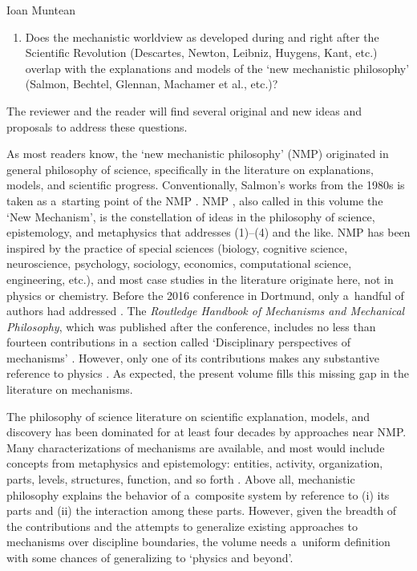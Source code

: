 \begin{recengenv}{Ioan Muntean}
\begin{enumerate}[label={(\arabic*)}]
\item Does the mechanistic worldview as developed during and right after the Scientific Revolution (Descartes, Newton, Leibniz, Huygens, Kant, etc.) overlap with the explanations and models of the ‘new mechanistic philosophy' (Salmon, Bechtel, Glennan, Machamer et al., etc.)?
\end{enumerate}

The reviewer and the reader will find several original and new ideas and proposals to address these questions.

As most readers know, the ‘new mechanistic philosophy' (NMP) originated in general philosophy of science, specifically in the literature on explanations, models, and scientific progress. Conventionally, Salmon's works from the 1980s is taken as a~starting point of the NMP
\parencites[][]{salmon_scientific_1984}[][]{salmon_four_1989}. %
 NMP 
\parencites[][]{glennan_new_2017}[][]{illari_routledge_2017}, %
 also called in this volume the ‘New Mechanism', is the constellation of ideas in the philosophy of science, epistemology, and metaphysics that addresses (1)–(4) and the like. NMP has been inspired by the practice of special sciences (biology, cognitive science, neuroscience, psychology, sociology, economics, computational science, engineering, etc.), and most case studies in the literature originate here, not in physics or chemistry. Before the 2016 conference in Dortmund, only a~handful of authors had addressed 
\parencites[][]{illari_what_2011}[][]{kuhlmann_relation_2014}. %
 The \textit{Routledge Handbook of Mechanisms and Mechanical Philosophy}, which was published after the conference, includes no less than fourteen contributions in a~section called ‘Disciplinary perspectives of mechanisms' 
\parencite[][]{illari_routledge_2017}. %
 However, only one of its contributions makes any substantive reference to physics 
\parencite[][]{kuhlmann_mechanisms_2017}. %
 As expected, the present volume fills this missing gap in the literature on mechanisms.

The philosophy of science literature on scientific explanation, models, and discovery has been dominated for at least four decades by approaches near NMP. Many characterizations of mechanisms are available, and most would include concepts from metaphysics and epistemology: entities, activity, organization, parts, levels, structures, function, and so forth
\parencite[][]{illari_routledge_2017}. %
 Above all, mechanistic philosophy explains the behavior of a~composite system by reference to (i) its parts and (ii) the interaction among these parts. However, given the breadth of the contributions and the attempts to generalize existing approaches to mechanisms over discipline boundaries, the volume needs a~uniform definition with some chances of generalizing to ‘physics and beyond'.


\end{recengenv}
